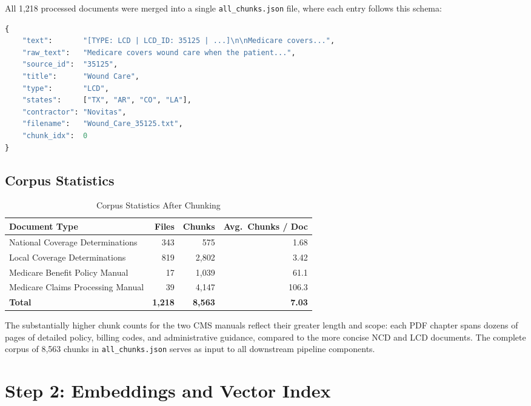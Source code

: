 \documentclass[10pt, letterpaper]{article}
\begin{document}
All 1,218 processed documents were merged into a single \texttt{all\_chunks.json} file,
where each entry follows this schema:
 
\begin{lstlisting}[language=Python, caption=JSON schema for each chunk in all\_chunks.json]
{
    "text":       "[TYPE: LCD | LCD_ID: 35125 | ...]\n\nMedicare covers...",
    "raw_text":   "Medicare covers wound care when the patient...",
    "source_id":  "35125",
    "title":      "Wound Care",
    "type":       "LCD",
    "states":     ["TX", "AR", "CO", "LA"],
    "contractor": "Novitas",
    "filename":   "Wound_Care_35125.txt",
    "chunk_idx":  0
}
\end{lstlisting}
 
\subsection{Corpus Statistics}
 
\begin{table}[h]
\centering
\caption{Corpus Statistics After Chunking}
\label{tab:corpus}
\begin{tabular}{@{}lrrr@{}}
\toprule
\textbf{Document Type} & \textbf{Files} & \textbf{Chunks} & \textbf{Avg.\ Chunks / Doc} \\
\midrule
National Coverage Determinations  & 343  & 575   & 1.68 \\
Local Coverage Determinations     & 819  & 2,802 & 3.42 \\
Medicare Benefit Policy Manual    & 17   & 1,039 & 61.1  \\
Medicare Claims Processing Manual & 39   & 4,147 & 106.3 \\
\midrule
\textbf{Total}                    & \textbf{1,218} & \textbf{8,563} & \textbf{7.03} \\
\bottomrule
\end{tabular}
\end{table}
 
The substantially higher chunk counts for the two CMS manuals reflect their greater
length and scope: each PDF chapter spans dozens of pages of detailed policy, billing
codes, and administrative guidance, compared to the more concise NCD and LCD documents.
The complete corpus of 8,563 chunks in \texttt{all\_chunks.json} serves as input to
all downstream pipeline components.
 

\section{Step 2: Embeddings and Vector Index}
\end{document}
